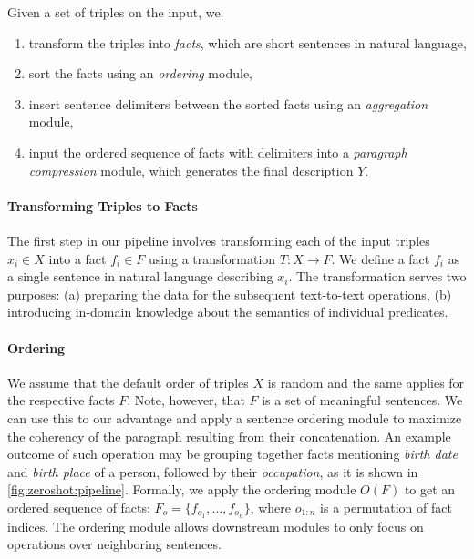 Given a set of triples on the input, we:
\begin{enumerate}
    \item transform the triples into \textit{facts}, which are short sentences in natural language,
    \item sort the facts using an \textit{ordering} module,
    \item insert sentence delimiters between the sorted facts using an \textit{aggregation} module,
    \item input the ordered sequence of facts with delimiters into a \textit{paragraph compression} module, which generates the final description $Y$.
\end{enumerate}

\paragraph{Transforming Triples to Facts}
\label{sec:templates}
The first step in our pipeline involves transforming each of the input triples $x_i \in X$ into a fact $f_i \in F$  using a transformation $T: X \rightarrow F$. We define a fact $f_i$ as a single sentence in natural language describing $x_i$.
The transformation serves two purposes: (a) preparing the data for the subsequent text-to-text operations, (b) introducing in-domain knowledge about the semantics of individual predicates.




\paragraph{Ordering} We assume that the default order of triples $X$ is random and the same applies for the respective facts $F$. Note, however, that $F$ is a set of meaningful sentences. We can use this to our advantage and apply a sentence ordering module \cite{barzilay2001sentence,lapata2003probabilistic} to maximize the coherency of the paragraph resulting from their concatenation. An example outcome of such operation may be grouping together facts mentioning \textit{birth date} and \textit{birth place} of a person, followed by their \textit{occupation}, as it is shown in \autoref{fig:zeroshot:pipeline}.
Formally, we apply the ordering module $O(F)$ to get an ordered sequence of facts: $F_o = \{f_{o_1}, \ldots, f_{o_n}\}$, where $o_{1:n}$ is a permutation of fact indices. The ordering module allows downstream modules to only focus on operations over neighboring sentences.


